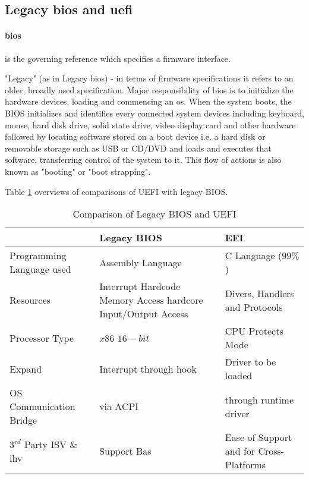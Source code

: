 \subsection{Legacy \gls{bios} and \gls{uefi}}

\paragraph{\gls{bios}} is the governing reference which specifies a firmware interface.

"Legacy" (as in Legacy \gls{bios}) -  in terms of firmware specifications it refers to an older, broadly used specification. Major responsibility of \gls{bios} is to initialize the hardware devices, loading and commencing an \gls{os}. When the system boots, the BIOS initializes and identifies every connected system devices including keyboard, mouse, hard disk drive, solid state drive, video display card and other hardware followed by locating software stored on a boot device i.e. a hard disk or removable storage such as USB or CD/DVD and loads and executes that software, transferring control of the system to it. This flow of actions is also known as "booting" or "boot strapping".

Table \ref{table:legacy-bios-vs-uefi} overviews of comparisons of UEFI with legacy BIOS.

\begin{table}
  \centering
  \renewcommand{\arraystretch}{2}
  \caption{Comparison of Legacy BIOS and UEFI}\label{table:legacy-bios-vs-uefi}
  \begin{tabular}{l | p{5cm} | p{5cm}}
    & Legacy BIOS & EFI
    \\ \hline \hline
    Programming Language used & Assembly Language & C Language ($ 99\% $)
    \\ \hline
    Resources & Interrupt Hardcode Memory Access hardcore Input/Output Access & Divers, Handlers and Protocols
    \\ \hline
    Processor Type & $ x86 $ $ 16-bit $ & CPU Protects Mode
    \\ \hline
    Expand & Interrupt through hook & Driver to be loaded
    \\ \hline
    OS Communication Bridge & via ACPI & through runtime driver
    \\ \hline
    $ 3^{rd} $ Party ISV \& \gls{ihv} & Support Bas & Ease of Support and for Cross-Platforms
    \\ \hline
  \end{tabular}
\end{table}

